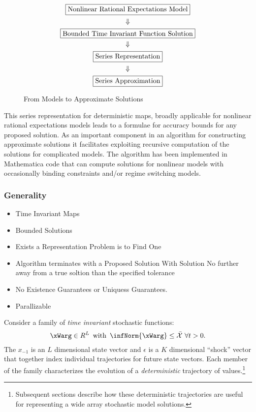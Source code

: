 \documentclass[12pt]{article}
\begin{document}
\begin{figure}
  \centering
  


  \begin{gather}
    \fbox{Nonlinear Rational Expectations Model}\\ \Downarrow\\
\fbox{Bounded Time Invariant Function Solution}\\\Downarrow\\
\fbox{Series Representation}\\\Downarrow\\
\fbox{Series Approximation}
  \end{gather}
  \caption{From Models to Approximate Solutions}
  \label{fig:modelsto}
\end{figure}



This series representation for deterministic maps,
broadly applicable for nonlinear rational expectations models 
leads to a formulae for accuracy bounds for any proposed solution.
As an important component in an algorithm for
constructing approximate solutions it
facilitates exploiting recursive computation of the solutions for complicated models.
The algorithm has been implemented in
Mathematica code that can compute solutions for
nonlinear models with occasionally binding constraints and/or regime switching models.






\subsubsection{Generality}
\label{sec:generality}




\begin{itemize}
\item Time Invariant Maps
\item Bounded Solutions
\item Exists a Representation Problem is to Find One
\item Algorithm terminates with a Proposed Solution With Solution
  No further away from a true soltion than the specified tolerance 
\item No Existence Guarantees or Uniquess Guarantees.
\item Parallizable
\end{itemize}


Consider a family of {\it time invariant } stochastic functions:
 \begin{gather}
   \xWarg \in{R^L}\,\text{ with }\,\infNorm{\xWarg}  \le \bar{\mathcal{X}}\,\,\forall t> 0 \label{fFamily}.
 \end{gather}
The $x_{-1}$ is an  $L$ dimensional state vector and $\epsilon$ is a $K$ dimensional ``shock'' vector that together index
individual trajectories for future state vectors.  
Each member of the family characterizes the evolution of a {\em deterministic} trajectory of values.\footnote{Subsequent sections describe how these deterministic trajectories are useful for representing a wide array stochastic model solutions.}
\end{document}
